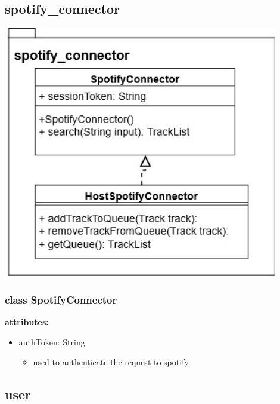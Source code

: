 \documentclass[oneside, nenglish]{sdqtechreport}
\begin{document}
\subsection{spotify\_connector}
\begin{center}
\includegraphics[width = 12cm]{LATEX/Entwurf/Graphics/spotify_connector.jpg}
\end{center}


\subsubsection{class SpotifyConnector}
\textbf{attributes:}
\begin{itemize}
    \item authToken: String
    \begin{itemize}
        \item used to authenticate the request to spotify
    \end{itemize}
\end{itemize}


\subsection{user}
\end{document}
